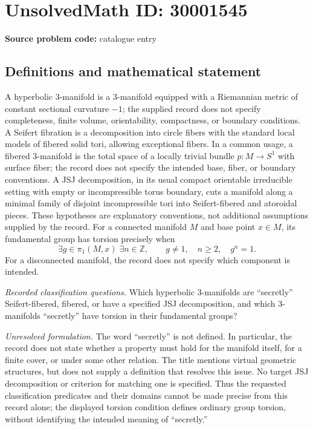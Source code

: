 \documentclass[11pt]{article}
\newcommand{\Z}{\mathbb{Z}}
\begin{document}
\section*{UnsolvedMath ID: 30001545}
\textbf{Source problem code:} catalogue entry
\subsection{Definitions and mathematical statement}
A hyperbolic \(3\)-manifold is a \(3\)-manifold equipped with a Riemannian metric of constant sectional curvature \(-1\); the supplied record does not specify completeness, finite volume, orientability, compactness, or boundary conditions. A Seifert fibration is a decomposition into circle fibers with the standard local models of fibered solid tori, allowing exceptional fibers. In a common usage, a fibered \(3\)-manifold is the total space of a locally trivial bundle \(p\colon M\to S^1\) with surface fiber; the record does not specify the intended base, fiber, or boundary conventions. A JSJ decomposition, in its usual compact orientable irreducible setting with empty or incompressible torus boundary, cuts a manifold along a minimal family of disjoint incompressible tori into Seifert-fibered and atoroidal pieces. These hypotheses are explanatory conventions, not additional assumptions supplied by the record. For a connected manifold \(M\) and base point \(x\in M\), its fundamental group has torsion precisely when
\[
\exists g\in\pi_1(M,x)\;\exists n\in\Z,\qquad g\ne 1,\quad n\ge 2,\quad g^n=1.
\]
For a disconnected manifold, the record does not specify which component is intended.

\emph{Recorded classification questions.} Which hyperbolic \(3\)-manifolds are ``secretly'' Seifert-fibered, fibered, or have a specified JSJ decomposition, and which \(3\)-manifolds ``secretly'' have torsion in their fundamental groups?

\emph{Unresolved formulation.} The word ``secretly'' is not defined. In particular, the record does not state whether a property must hold for the manifold itself, for a finite cover, or under some other relation. The title mentions virtual geometric structures, but does not supply a definition that resolves this issue. No target JSJ decomposition or criterion for matching one is specified. Thus the requested classification predicates and their domains cannot be made precise from this record alone; the displayed torsion condition defines ordinary group torsion, without identifying the intended meaning of ``secretly.''
\end{document}
